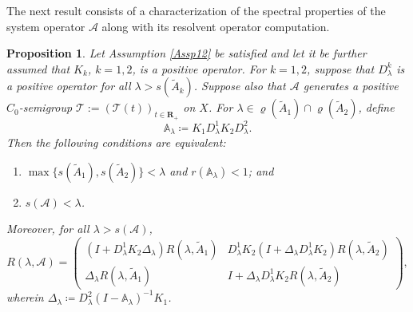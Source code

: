 \documentclass[a4paper,11pt,reqno]{amsart}
\def\la{\lambda}
\def\calA{{\mathcal{A}}}
\def\R{\mathbf{R}}
\theoremstyle{plain}
\newtheorem{proposition}{Proposition}[section]
\numberwithin{equation}{section}
\begin{document}
The next result consists of a characterization of the spectral properties of the system operator $\calA$ along with its resolvent operator computation. 
\begin{proposition}\label{Spectrum}
Let Assumption \ref{Assp12} be satisfied and let it be further assumed that $K_k$, $k=1,2$, is a positive operator. For $k=1,2$, suppose that $D_\lambda^k$ is a positive operator for all $\lambda > s(\tilde{A}_k)$. Suppose also that $\mathcal{A}$ generates a positive $C_0$-semigroup $\mathcal{T} := (\mathcal{T}(t))_{t\in\R_+}$ on $X$. For $\lambda \in \varrho(\tilde{A}_1) \cap \varrho(\tilde{A}_2)$, define
\begin{equation*}
\mathbb{A}_\la\coloneqq K_1 D_\la^1 K_2 D_\la^2.
\end{equation*}
Then the following conditions are equivalent:
\begin{enumerate}[\normalfont(i)]
\item\label{implSpectrum01} $\max\big\{s(\tilde{A}_1), s(\tilde{A}_2)\big\}<\lambda$ and $r(\mathbb{A}_\lambda)<1$; and
\item\label{implSpectrum02} $s(\mathcal{A})<\lambda$.
\end{enumerate}
Moreover, for all $\lambda>s(\mathcal{A})$, 
\begin{equation}\label{resolvent-operator}
R(\la, \calA)=
\left(\begin{matrix}
\left(I+ D_\la^1 K_2 \Delta_\la\right)R(\la,\tilde{A}_1) & D_\la^1 K_2\left(I+ \Delta_\la D_\la^1 K_2\right)R(\la,\tilde{A}_2)\\
\Delta_\la R(\la,\tilde{A}_1) & I+\Delta_\la D_\la^1K_2 R(\la,\tilde{A}_2)
\end{matrix}\right),
\end{equation}
wherein $\Delta_\la\coloneqq D_\la^2\left(I-\mathbb{A}_\la\right)^{-1}K_1$.
\end{proposition} 
\end{document}
